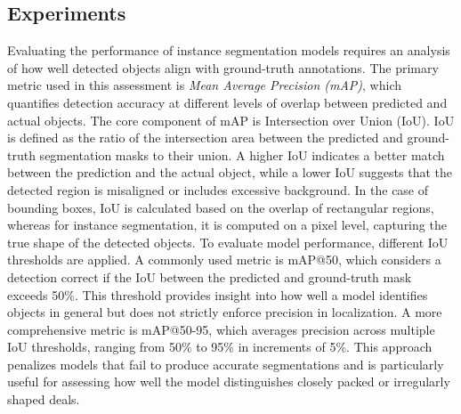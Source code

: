 \documentclass[11pt]{article}
\begin{document}
\subsection{Experiments}
Evaluating the performance of instance segmentation models requires an analysis of how well detected objects align with ground-truth annotations. The primary metric used in this assessment is \emph{Mean Average Precision (mAP)}, which quantifies detection accuracy at different levels of overlap between predicted and actual objects. The core component of mAP is Intersection over Union (IoU). IoU is defined as the ratio of the intersection area between the predicted and ground-truth segmentation masks to their union. A higher IoU indicates a better match between the prediction and the actual object, while a lower IoU suggests that the detected region is misaligned or includes excessive background. In the case of bounding boxes, IoU is calculated based on the overlap of rectangular regions, whereas for instance segmentation, it is computed on a pixel level, capturing the true shape of the detected objects. To evaluate model performance, different IoU thresholds are applied. A commonly used metric is mAP@50, which considers a detection correct if the IoU between the predicted and ground-truth mask exceeds 50\%. This threshold provides insight into how well a model identifies objects in general but does not strictly enforce precision in localization. A more comprehensive metric is mAP@50-95, which averages precision across multiple IoU thresholds, ranging from 50\% to 95\% in increments of 5\%. This approach penalizes models that fail to produce accurate segmentations and is particularly useful for assessing how well the model distinguishes closely packed or irregularly shaped deals.
\end{document}
